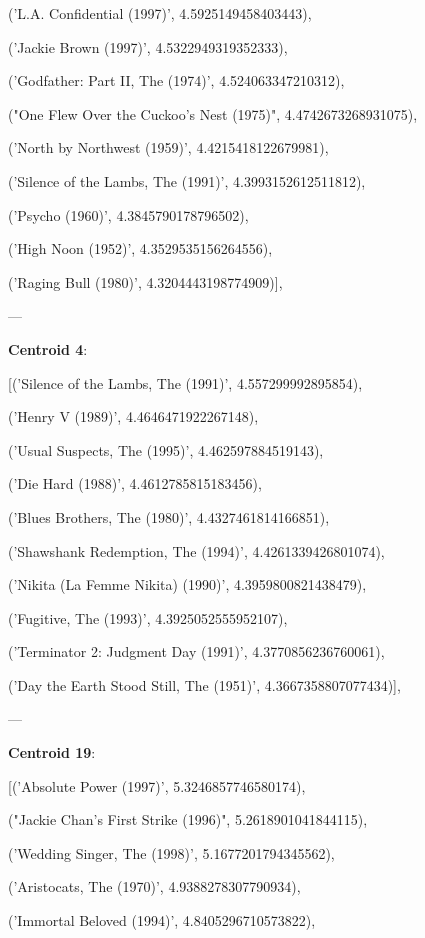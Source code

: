 \documentclass[11pt]{article}
\begin{document}
     ('L.A. Confidential (1997)', 4.5925149458403443),
     
     ('Jackie Brown (1997)', 4.5322949319352333),
 
     ('Godfather: Part II, The (1974)', 4.524063347210312),
 
     ("One Flew Over the Cuckoo's Nest (1975)", 4.4742673268931075),
 
     ('North by Northwest (1959)', 4.4215418122679981),
 
     ('Silence of the Lambs, The (1991)', 4.3993152612511812),
 
     ('Psycho (1960)', 4.3845790178796502),
 
     ('High Noon (1952)', 4.3529535156264556),
 
     ('Raging Bull (1980)', 4.3204443198774909)],
     
     ---
     
\textbf{Centroid 4}:
 
 [('Silence of the Lambs, The (1991)', 4.557299992895854),
 
     ('Henry V (1989)', 4.4646471922267148),
 
     ('Usual Suspects, The (1995)', 4.462597884519143),
 
     ('Die Hard (1988)', 4.4612785815183456),
 
     ('Blues Brothers, The (1980)', 4.4327461814166851),
 
     ('Shawshank Redemption, The (1994)', 4.4261339426801074),
 
     ('Nikita (La Femme Nikita) (1990)', 4.3959800821438479),
 
     ('Fugitive, The (1993)', 4.3925052555952107),
 
     ('Terminator 2: Judgment Day (1991)', 4.3770856236760061),
 
     ('Day the Earth Stood Still, The (1951)', 4.3667358807077434)],
     
     ---
     
\textbf{Centroid 19}:
 
 [('Absolute Power (1997)', 5.3246857746580174),
 
      ("Jackie Chan's First Strike (1996)", 5.2618901041844115),
 
      ('Wedding Singer, The (1998)', 5.1677201794345562),
 
      ('Aristocats, The (1970)', 4.9388278307790934),
 
      ('Immortal Beloved (1994)', 4.8405296710573822),
 
\end{document}
